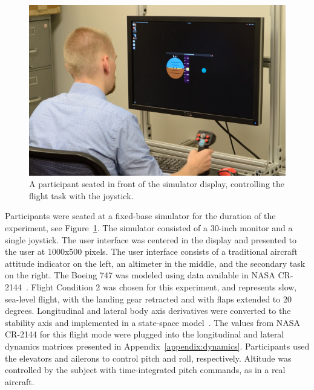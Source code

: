 \begin{figure}[ptb]
    \begin{center}
        \includegraphics[width=\linewidth]{figures/Aircraft/image2.png}
        \caption[A participant seated in front of the simulator display]{A participant seated in front of the simulator display, controlling the flight task with the joystick.}
        \label{figure-hfes:participant}
    \end{center}
\end{figure}

Participants were seated at a fixed-base simulator for the duration of the experiment, see Figure~\ref{figure-hfes:participant}.
The simulator consisted of a 30-inch monitor and a single joystick.
The user interface was centered in the display and presented to the user at 1000x500 pixels.
The user interface consists of a traditional aircraft attitude indicator on the left, an altimeter in the middle, and the secondary task on the right.
The Boeing 747 was modeled using data available in NASA CR-2144~\citep{heffley1972aircraft}.
Flight Condition 2 was chosen for this experiment, and represents slow, sea-level flight, with the landing gear retracted and with flaps extended to 20 degrees.
Longitudinal and lateral body axis derivatives were converted to the stability axis and implemented in a state-space model~\citep{stevens2015aircraft}.
The values from NASA CR-2144 for this flight mode were plugged into the longitudinal and lateral dynamics matrices presented in Appendix~\ref{appendix:dynamics}.
Participants used the elevators and ailerons to control pitch and roll, respectively.
Altitude was controlled by the subject with time-integrated pitch commands, as in a real aircraft.

